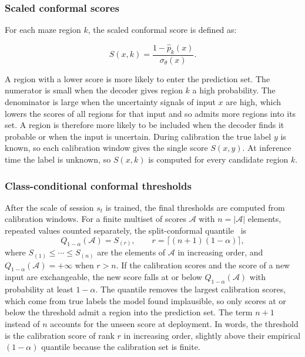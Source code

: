 \documentclass{article}
\begin{document}
\subsubsection{Scaled conformal scores}
For each maze region $k$, the scaled conformal score is defined as:

\begin{equation}
  S(x,k)=\frac{1-\hat p_k(x)}{\sigma_\theta(x)} .
\end{equation}

A region with a lower score is more likely to enter the prediction set. The numerator is small when the decoder gives region $k$ a high probability. The denominator is large when the uncertainty signals of input $x$ are high, which lowers the scores of all regions for that input and so admits more regions into its set. A region is therefore more likely to be included when the decoder finds it probable or when the input is uncertain. During calibration the true label $y$ is known, so each calibration window gives the single score $S(x,y)$. At inference time the label is unknown, so $S(x,k)$ is computed for every candidate region $k$.

\subsubsection{Class-conditional conformal thresholds}
\label{sec:class-conditional}
After the scale of session $s_t$ is trained, the final thresholds are computed from calibration windows. For a finite multiset of scores $\mathcal{A}$ with $n=|\mathcal{A}|$ elements, repeated values counted separately, the split-conformal quantile~\cite{angelopoulos2022a} is
\begin{equation}
  Q_{1-\alpha}(\mathcal{A})=S_{(r)},\qquad r=\big\lceil (n+1)(1-\alpha)\big\rceil,
\end{equation}
where $S_{(1)}\le\cdots\le S_{(n)}$ are the elements of $\mathcal{A}$ in increasing order, and $Q_{1-\alpha}(\mathcal{A})=+\infty$ when $r>n$. If the calibration scores and the score of a new input are exchangeable, the new score falls at or below $Q_{1-\alpha}(\mathcal{A})$ with probability at least $1-\alpha$. The quantile removes the largest calibration scores, which come from true labels the model found implausible, so only scores at or below the threshold admit a region into the prediction set. The term $n+1$ instead of $n$ accounts for the unseen score at deployment. In words, the threshold is the calibration score of rank $r$ in increasing order, slightly above their empirical $(1-\alpha)$ quantile because the calibration set is finite.
\end{document}
